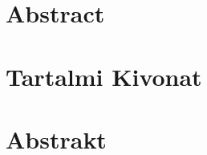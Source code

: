 \chapter*{Abstract}
\thispagestyle{plain}

\chapter*{Tartalmi Kivonat}
\thispagestyle{plain}

\chapter*{Abstrakt}
\thispagestyle{plain}


